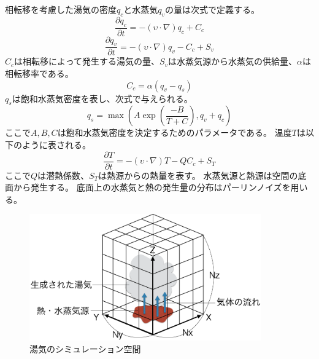 相転移を考慮した湯気の密度$q_{c}$と水蒸気$q_{v}$の量は次式で定義する。
\begin{equation}
\label{steam}
\frac{\partial q_{c}}{\partial t} = -(\upsilon \cdot \nabla)q_{c} + C_{c}
\end{equation}
\begin{equation}
\label{vapor}
\frac{\partial q_{v}}{\partial t} = -(\upsilon \cdot \nabla)q_{v} - C_{c} + S_{v}
\end{equation}
$C_{c}$は相転移によって発生する湯気の量、$S_{v}$は水蒸気源から水蒸気の供給量、$\alpha$は相転移率である。
\begin{equation}
\label{transition}
C_{c} = \alpha(q_{v}-q_{s})
\end{equation}
$q_{s}$は飽和水蒸気密度を表し、次式で与えられる。	
\begin{equation}
\label{saturation}
q_{s} = \max\left(A \exp\left(\frac{-B}{T+C}\right),q_{v}+q_{c}\right)
\end{equation}
ここで$A,B,C$は飽和水蒸気密度を決定するためのパラメータである。
温度$T$は以下のように表される。
\begin{equation}
\label{temperature}
\frac{\partial T}{\partial t} = - (\upsilon \cdot \nabla)T - QC_{c} + S_{T}
\end{equation}
ここで$Q$は潜熱係数、$S_{T}$は熱源からの熱量を表す。
水蒸気源と熱源は空間の底面から発生する。
底面上の水蒸気と熱の発生量の分布はパーリンノイズ\cite{Perlin1985}\cite{Perlin2002}を用いる。
\begin{figure}
	\begin{center}
		\includegraphics[width=100mm]{simulation.png}
		\caption{湯気のシミュレーション空間}
		\label{simulation}
	\end{center}
\end{figure}

